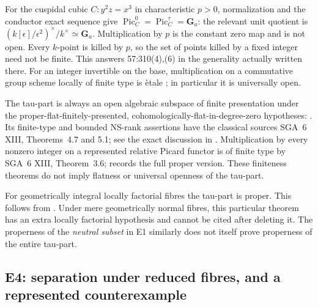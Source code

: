 For the cuspidal cubic $C:y^2z=x^3$ in characteristic $p>0$, normalization
and the conductor exact sequence give
$\operatorname{Pic}^0_C=\operatorname{Pic}^\tau_C=\mathbf G_a$:
the relevant unit quotient is
$(k[\epsilon]/\epsilon^2)^\times/k^\times\simeq\mathbf G_a$.
Multiplication by $p$ is the constant zero map and is not open. Every
$k$-point is killed by $p$, so the set of points killed by a fixed integer
need not be finite. This answers 57:310(4),(6) in the generality actually
written there. For an integer invertible on the base, multiplication on a
commutative group scheme locally of finite type is \`etale
\cite[Theorem~2.5]{Grothendieck1962VI}; in particular it is universally open.

The tau-part is always an open algebraic subspace of finite presentation
under the proper-flat-finitely-presented, cohomologically-flat-in-degree-zero
hypotheses: \cite[Theorem~2.1]{LaurentSchroer2024}. Its finite-type and bounded
NS-rank assertions have the classical sources SGA~6 XIII, Theorems~4.7 and
5.1; see the exact discussion in \cite[Remark~6.19]{Kleiman2005}. Multiplication
by every nonzero integer on a represented relative Picard functor is of finite
type by SGA~6 XIII, Theorem~3.6; \cite[Remark~6.28]{Kleiman2005} records the
full proper version. These finiteness theorems do not imply flatness or
universal openness of the tau-part.

For geometrically integral locally factorial fibres the tau-part is proper.
This follows from \cite[Proposition~2.3(ii)]{LaurentSchroer2024}. Under mere geometrically
normal fibres, this particular theorem has an extra locally factorial
hypothesis and cannot be cited after deleting it. The properness of the
\emph{neutral subset} in E1 similarly does not itself prove properness of
the entire tau-part.

\subsection{E4: separation under reduced fibres, and a represented counterexample}


